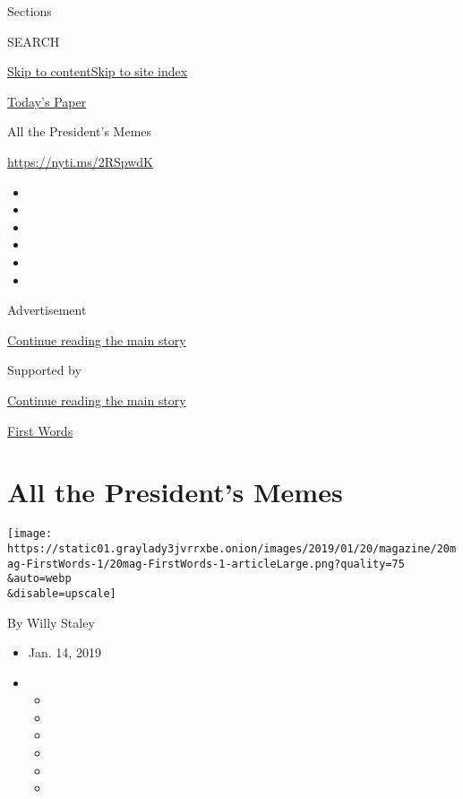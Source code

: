 Sections

SEARCH

\protect\hyperlink{site-content}{Skip to
content}\protect\hyperlink{site-index}{Skip to site index}

\href{https://myaccount.nytimes3xbfgragh.onion/auth/login?response_type=cookie\&client_id=vi}{}

\href{https://www.nytimes3xbfgragh.onion/section/todayspaper}{Today's
Paper}

All the President's Memes

\url{https://nyti.ms/2RSpwdK}

\begin{itemize}
\item
\item
\item
\item
\item
\item
\end{itemize}

Advertisement

\protect\hyperlink{after-top}{Continue reading the main story}

Supported by

\protect\hyperlink{after-sponsor}{Continue reading the main story}

\href{/column/first-words}{First Words}

\hypertarget{all-the-presidents-memes}{%
\section{All the President's Memes}\label{all-the-presidents-memes}}

\texttt{[image: https://static01.graylady3jvrrxbe.onion/images/2019/01/20/magazine/20mag-FirstWords-1/20mag-FirstWords-1-articleLarge.png?quality=75\\\&auto=webp\\\&disable=upscale]}

By Willy Staley

\begin{itemize}
\item
  Jan. 14, 2019
\item
  \begin{itemize}
  \item
  \item
  \item
  \item
  \item
  \item
  \end{itemize}
\end{itemize}

